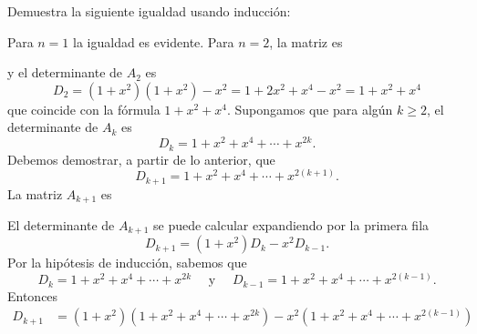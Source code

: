 \begin{examplebox}{}{}
    Demuestra la siguiente igualdad usando inducción:
    \begin{matrizn}
    \end{matrizn}

    \tcblower
    \demostracion Para $n = 1$ la igualdad es evidente. Para $n = 2$, la matriz es
    \begin{matrizn}
    \end{matrizn}
    y el determinante de $A_2$ es
    $$D_2 = \left(1 + x^2\right)\left(1 + x^2\right) - x^2 = 1 + 2x^2 + x^4 - x^2 = 1 + x^2 + x^4$$
    que coincide con la fórmula $1 + x^2 + x^4$. Supongamos que para algún $k \geq 2$, el determinante de $A_k$ es
    $$D_k = 1 + x^2 + x^4 + \cdots + x^{2k}.$$
    Debemos demostrar, a partir de lo anterior, que
    $$D_{k+1} = 1 + x^2 + x^4 + \cdots + x^{2(k+1)}.$$
    La matriz $A_{k+1}$ es
    \begin{matrizn}
    \end{matrizn}
    El determinante de $A_{k+1}$ se puede calcular expandiendo por la primera fila
    $$D_{k+1} = \left(1 + x^2\right)D_k - x^2 D_{k-1}.$$
    Por la hipótesis de inducción, sabemos que
    $$D_k = 1 + x^2 + x^4 + \cdots + x^{2k} \quad \text{ y } \quad D_{k-1} = 1 + x^2 + x^4 + \cdots + x^{2(k-1)}.$$
    Entonces
    \begin{align*}
        D_{k+1} & = \left(1 + x^2\right)\left(1 + x^2 + x^4 + \cdots + x^{2k}\right) - x^2\left(1 + x^2 + x^4 + \cdots + x^{2(k-1)}\right) \\

\end{align*}
\end{examplebox}
